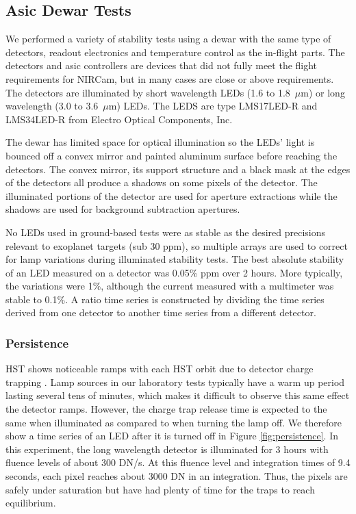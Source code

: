 \documentclass{aastex62}
\begin{document}
{\clearpage
\subsection{Asic Dewar Tests}
We performed a variety of stability tests using a dewar with the same type of detectors, readout electronics and temperature control as the in-flight parts.
The detectors and asic controllers are devices that did not fully meet the flight requirements for NIRCam, but in many cases are close or above requirements.
The detectors are illuminated by short wavelength LEDs (1.6 to 1.8~$\mu$m) or long wavelength (3.0 to 3.6~$\mu$m) LEDs.
The LEDS are type LMS17LED-R and LMS34LED-R from Electro Optical Components, Inc.

The dewar has limited space for optical illumination so the LEDs' light is bounced off a convex mirror and painted aluminum surface before reaching the detectors.
The convex mirror, its support structure and a black mask at the edges of the detectors all produce a shadows on some pixels of the detector.
The illuminated portions of the detector are used for aperture extractions while the shadows are used for background subtraction apertures.

No LEDs used in ground-based tests were as stable as the desired precisions relevant to exoplanet targets (sub 30 ppm), so multiple arrays are used to correct for lamp variations during illuminated stability tests.
The best absolute stability of an LED measured on a detector was 0.05\% ppm over 2 hours.
More typically, the variations were 1\%, although the current measured with a multimeter was stable to 0.1\%.
A ratio time series is constructed by dividing the time series derived from one detector to another time series from a different detector.

\subsubsection{Persistence}
HST shows noticeable ramps with each HST orbit due to detector charge trapping \citep{zhou2017chargeTrap}.
Lamp sources in our laboratory tests typically have a warm up period lasting several tens of minutes, which makes it difficult to observe this same effect the detector ramps.
However, the charge trap release time is expected to the same when illuminated as compared to when turning the lamp off.
We therefore show a time series of an LED after it is turned off in Figure \ref{fig:persistence}.
In this experiment, the long wavelength detector is illuminated for 3 hours with fluence levels of about 300 DN/s.
At this fluence level and integration times of 9.4 seconds, each pixel reaches about 3000 DN in an integration.
Thus, the pixels are safely under saturation but have had plenty of time for the traps to reach equilibrium.

}
\end{document}
